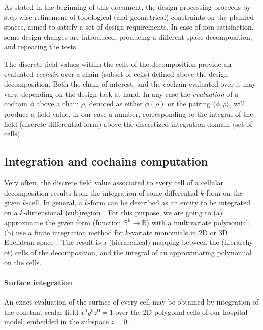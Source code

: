 \documentclass[11pt,oneside]{article}    %
\def\R{\mathbb{R}}
\begin{document}
As stated in the beginning of this document, the design processing proceeds by step-wise refinement 
of topological (and geometrical) constraints on the planned spaces, aimed to satisfy
a set of design requirements. In case of non-satisfaction, some design changes are introduced, producing a different space decomposition, and repeating the tests.

The discrete field values within the cells of the decomposition provide an evaluated \emph{cochain} over 
a chain (subset of cells) defined above the design decomposition. Both the chain of interest, and the cochain evaluated over it may vary, depending on the design task at hand. In any case the \emph{evaluation} of a cochain $\phi$ above a chain $\rho$, denoted as either $\phi(\rho)$ or the pairing $\langle \phi,\rho \rangle$, will produce a field value, in our case a number, corresponding to the integral of the field (discrete differential form) above the discretized integration domain (set of cells).

\subsection{Integration and cochains computation}

Very often, the discrete field value associated to every cell of a cellular decomposition  results from the integration  of some differential $k$-form on the given $k$-cell.  In general, a $k$-form can be described as an entity to be integrated on a $k$-dimensional (sub)region~\cite{Desbrun:2005:DDF:1198555.1198666}.
For this purpose, we are going to  (a)  approximate the given form (function $\R^k \to \R$) with a multivariate polynomial;
(b)    use a finite integration method for $k$-variate monomials in 2D or 3D Euclidean space~\cite{CattaniP-BIL1990}.
The result is a (hierarchical) mapping between the (hierarchy of) cells of the decomposition, and the integral of an approximating polynomial on the cells.

\paragraph{Surface integration}

An exact evaluation of the surface of every cell may be obtained by integration of the constant scalar field $x^0y^0z^0 = 1$ over the 2D polygonal cells of our hospital model, embedded in the subspace $z=0$. 
\end{document}

